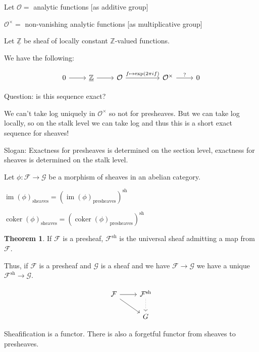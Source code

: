 \documentclass{article}
\theoremstyle{definition}
\newtheorem{theorem}{Theorem}
\begin{document}
    Let \(\mathcal{O} =\) analytic functions [as additive group]

    \(\mathcal{O} ^\times =\) non-vanishing analytic functions [as multiplicative group]

    Let \(\underline{\mathbb{Z}}\) be sheaf of locally constant \(\mathbb{Z}\)-valued functions.

    We have the following:

    \[
        \begin{tikzcd}
            0 \ar[r] & \underline{\mathbb{Z}} \ar[r] & \mathcal{O} \ar[rr, "f \mapsto \exp(2 \pi i f)"] & & \mathcal{O}^\times \ar[r,"?"] & 0
        \end{tikzcd}
    \]

    Question: is this sequence exact?

    We can't take log uniquely in \(\mathcal{O}^\times\) so not for presheaves. But we can take log locally, so on the stalk level we can take log and thus this is a short exact sequence for sheaves!

    Slogan: Exactness for presheaves is determined on the section level, exactness for sheaves is determined on the stalk level.

    Let \(\phi : \mathcal{F} \to \mathcal{G}\) be a morphism of sheaves in an abelian category.

    \(\operatorname{im} (\phi)_{\text{sheaves}} = (\operatorname{im}(\phi)_{\text{presheaves}})^{\operatorname{sh}}\)

    \(\operatorname{coker}(\phi)_{\text{sheaves}} = (\operatorname{coker}(\phi)_{\text{presheaves}})^{\operatorname{sh}}\) 
    
    \begin{theorem}
        If \(\mathcal{F}\) is a presheaf, \(\mathcal{F}^{\operatorname{sh}}\) is the universal sheaf admitting a map from \(\mathcal{F}\).
    \end{theorem}

    Thus, if \(\mathcal{F}\) is a presheaf and \(\mathcal{G}\) is a sheaf and we have \(\mathcal{F} \to \mathcal{G}\) we have a unique \(\mathcal{F}^{\operatorname{sh}} \to \mathcal{G}\).
    
    \[
        \begin{tikzcd}
            \mathcal{F} \ar[r] \ar[rd] & \mathcal{F}^{\operatorname{sh}} \ar[d, dotted] \\ & G
        \end{tikzcd}
    \]

    Sheafification is a functor. There is also a forgetful functor from sheaves to presheaves.
\end{document}
